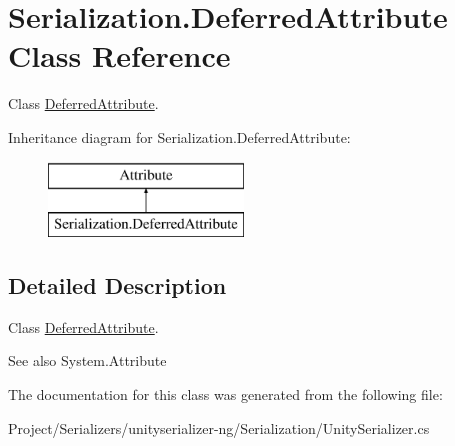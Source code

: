 \hypertarget{class_serialization_1_1_deferred_attribute}{}\section{Serialization.\+Deferred\+Attribute Class Reference}
\label{class_serialization_1_1_deferred_attribute}


Class \hyperlink{class_serialization_1_1_deferred_attribute}{Deferred\+Attribute}.  


Inheritance diagram for Serialization.\+Deferred\+Attribute\+:\begin{figure}[H]
\begin{center}
\leavevmode
\includegraphics[height=2.000000cm]{class_serialization_1_1_deferred_attribute}
\end{center}
\end{figure}


\subsection{Detailed Description}
Class \hyperlink{class_serialization_1_1_deferred_attribute}{Deferred\+Attribute}. 

\begin{DoxySeeAlso}{See also}
System.\+Attribute


\end{DoxySeeAlso}


The documentation for this class was generated from the following file\+:\begin{DoxyCompactItemize}
\item 
Project/\+Serializers/unityserializer-\/ng/\+Serialization/Unity\+Serializer.\+cs\end{DoxyCompactItemize}
